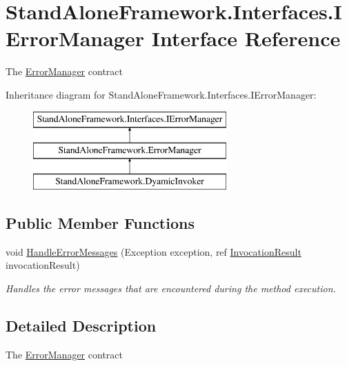 \hypertarget{interface_stand_alone_framework_1_1_interfaces_1_1_i_error_manager}{\section{Stand\+Alone\+Framework.\+Interfaces.\+I\+Error\+Manager Interface Reference}
\label{interface_stand_alone_framework_1_1_interfaces_1_1_i_error_manager}
}


The \hyperlink{class_stand_alone_framework_1_1_error_manager}{Error\+Manager} contract  


Inheritance diagram for Stand\+Alone\+Framework.\+Interfaces.\+I\+Error\+Manager\+:\begin{figure}[H]
\begin{center}
\leavevmode
\includegraphics[height=3.000000cm]{interface_stand_alone_framework_1_1_interfaces_1_1_i_error_manager}
\end{center}
\end{figure}
\subsection*{Public Member Functions}
\begin{DoxyCompactItemize}
\item 
void \hyperlink{interface_stand_alone_framework_1_1_interfaces_1_1_i_error_manager_a54b9927bcf2778d3626a60f7439e41eb}{Handle\+Error\+Messages} (Exception exception, ref \hyperlink{class_stand_alone_framework_1_1_framework_classes_1_1_invocation_result}{Invocation\+Result} invocation\+Result)
\begin{DoxyCompactList}\small\item\em Handles the error messages that are encountered during the method execution. \end{DoxyCompactList}\end{DoxyCompactItemize}


\subsection{Detailed Description}
The \hyperlink{class_stand_alone_framework_1_1_error_manager}{Error\+Manager} contract 



